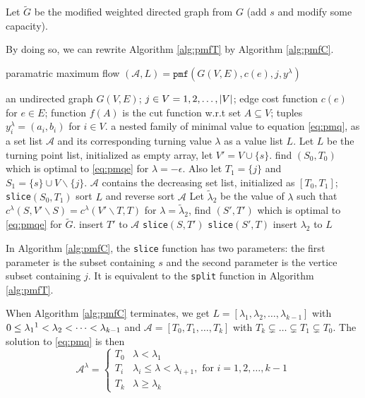 \documentclass{article}
\begin{document}
Let $\widetilde{G}$ be the modified weighted directed graph from $G$ (add $s$ and modify some capacity). 


By doing so, we can rewrite Algorithm \ref{alg:pmfT} by Algorithm \ref{alg:pmfC}.
\begin{algorithm}
\caption{paramatric maximum flow $(\mathcal{A}, L) = \texttt{pmf}(G(V,E), c(e), j, y^{\lambda})$}\label{alg:pmfC}
\begin{algorithmic}[1]
\REQUIRE an undirected graph $G(V, E)$; $j \in V={1,2,\dots, \lvert V\rvert}$; edge cost function $c(e)$ for $e \in E$; function $f(A)$ is the cut function w.r.t set $A\subseteq V$; tuples $y^{\lambda}_i = (a_i, b_i)$ for $i \in V$.
\ENSURE a nested family of minimal value to equation \eqref{eq:pmq}, as a set list $\mathcal{A}$ and its corresponding turning value $\lambda$ as a value list $L$.
\STATE Let $L$ be the turning point list, initialized as empty array, let $V'=V\cup\{s\}$.
\STATE find $(S_0, T_0)$ which is optimal to \eqref{eq:pmqe} for $ \lambda  = -\epsilon$.  Also let $T_1 = \{j\}$ and $S_1 = \{s\}\cup V \backslash \{j\}$.
\STATE $\mathcal{A}$ contains the decreasing set list, initialized as $[T_0, T_1]$;
\STATE \texttt{slice}$( S_0, T_1)$
\STATE sort $L$ and reverse sort $\mathcal{A}$
  \STATE Let $\tilde{\lambda}_2$ be the value of $\lambda$ such that $c^{\lambda}(S, V'\backslash S) = 
c^{\lambda}(V'\backslash T, T)$ \label{findLambda}
\STATE for $\lambda = \tilde{\lambda}_2$, find $(S', T')$ which is optimal to \eqref{eq:pmqe} for $\widetilde{G}$.
\STATE insert $T'$ to $\mathcal{A}$
\STATE \texttt{slice}$(S, T')$
\STATE \texttt{slice}$(S', T)$
\ELSE
\STATE insert $\lambda_2$ to $L$
\ENDIF
\ENDFUNCTION
\end{algorithmic}
\end{algorithm}
In Algorithm \ref{alg:pmfC}, the \texttt{slice} function has two parameters:
the first parameter is the subset containing $s$ and the second parameter is the vertice subset containing $j$. It is equivalent to the \texttt{split} function in Algorithm \ref{alg:pmfT}.

When Algorithm \ref{alg:pmfC} terminates, we get $L=[\lambda_1, \lambda_2, \dots, \lambda_{k-1}]$ with
$0 \leq \lambda_1 \footnotemark < \lambda_2 < \dots < \lambda_{k-1}$ and $\mathcal{A} = [T_0, T_1, \dots, T_k]$ with 
$T_k \subsetneq  \dots \subsetneq T_1 \subsetneq T_0$.  The solution to \eqref{eq:pmq} is then
\begin{equation}\label{eq:Alambda}
\mathcal{A}^{\lambda}=\begin{cases}
T_0 & \lambda < \lambda_1 \\
T_i & \lambda_i \leq \lambda < \lambda_{i+1}, \textrm{ for } i=1, 2, \dots, k-1 \\
T_k & \lambda \geq \lambda_{k}
\end{cases}
\end{equation}
\end{document}
